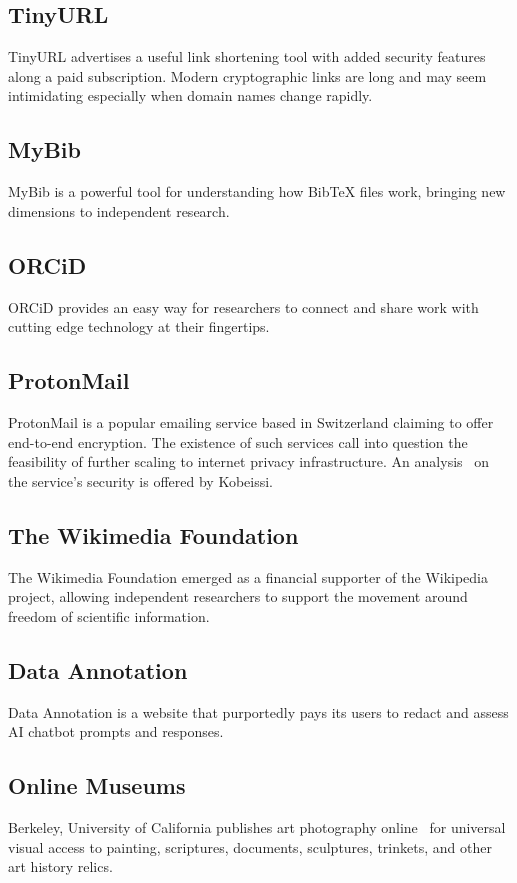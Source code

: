 \documentclass[11pt]{article}
\begin{document}
\subsection{TinyURL~\cite{a2019_tinyurlcom}}
TinyURL advertises a useful link shortening tool with added security features along a paid subscription. Modern cryptographic links are long and may seem intimidating especially when domain names change rapidly.
\subsection{MyBib~\cite{mybib_2018_mybib}}
MyBib is a powerful tool for understanding how BibTeX files work, bringing new dimensions to independent research.
\subsection{ORCiD~\cite{orcid_2019_orcid}}
ORCiD provides an easy way for researchers to connect and share work with cutting edge technology at their fingertips.
\subsection{ProtonMail~\cite{kobeissi_2018_an}}
ProtonMail is a popular emailing service based in Switzerland claiming to offer end-to-end encryption. The existence of such services call into question the feasibility of further scaling to internet privacy infrastructure. An analysis~\cite{kobeissi_2018_an} on the service's security is offered by Kobeissi.
\subsection{The Wikimedia Foundation~\cite{a2018_wikimedia}}
The Wikimedia Foundation emerged as a financial supporter of the Wikipedia project, allowing independent researchers to support the movement around freedom of scientific information.
\subsection{Data Annotation~\cite{data}}
Data Annotation is a website that purportedly pays its users to redact and assess AI chatbot prompts and responses.
\subsection{Online Museums}
Berkeley, University of California publishes art photography online~\cite{a2024_library} for universal visual access to painting, scriptures, documents, sculptures, trinkets, and other art history relics.
\end{document}
